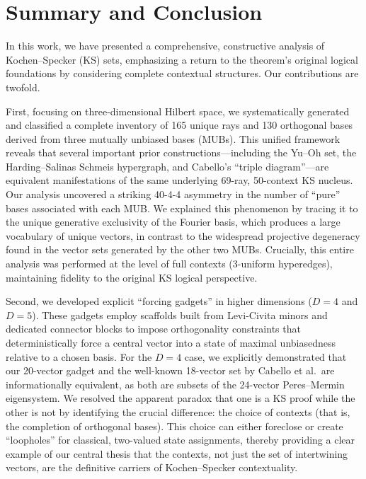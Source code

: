 \documentclass[%
  reprint,
  superscriptaddress,
  showpacs,
  showkeys,
  amsmath,amssymb,
  pra,
  longbibliography,
  floatfix,
  x11names
]{revtex4-2}
\begin{document}
\section{Summary and Conclusion}


In this work, we have presented a comprehensive, constructive analysis of Kochen--Specker (KS) sets, emphasizing a return to the theorem's original logical foundations by considering complete contextual structures. Our contributions are twofold.

First, focusing on three-dimensional Hilbert space, we systematically generated and classified a complete inventory of 165 unique rays and 130 orthogonal bases derived from three mutually unbiased bases (MUBs). This unified framework reveals that several important prior constructions---including the Yu--Oh set, the Harding--Salinas Schmeis hypergraph, and Cabello's ``triple diagram''---are equivalent manifestations of the same underlying 69-ray, 50-context KS nucleus. Our analysis uncovered a striking 40-4-4 asymmetry in the number of ``pure'' bases associated with each MUB. We explained this phenomenon by tracing it to the unique generative exclusivity of the Fourier basis, which produces a large vocabulary of unique vectors, in contrast to the widespread projective degeneracy found in the vector sets generated by the other two MUBs. Crucially, this entire analysis was performed at the level of full contexts (3-uniform hyperedges), maintaining fidelity to the original KS logical perspective.

Second, we developed explicit ``forcing gadgets'' in higher dimensions ($D=4$ and $D=5$). These gadgets employ scaffolds built from Levi-Civita minors and dedicated connector blocks to impose orthogonality constraints that deterministically force a central vector into a state of maximal unbiasedness relative to a chosen basis. For the $D=4$ case, we explicitly demonstrated that our 20-vector gadget and the well-known 18-vector set by Cabello et al.\ are informationally equivalent, as both are subsets of the 24-vector Peres--Mermin eigensystem. We resolved the apparent paradox that one is a KS proof while the other is not by identifying the crucial difference: the choice of contexts (that is, the completion of orthogonal bases). This choice can either foreclose or create ``loopholes'' for classical, two-valued state assignments, thereby providing a clear example of our central thesis that the contexts, not just the set of intertwining vectors, are the definitive carriers of Kochen--Specker contextuality.
\end{document}
